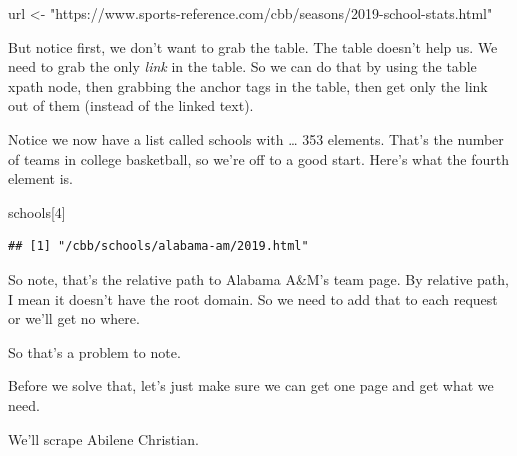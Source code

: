 \documentclass[]{book}
\newenvironment{Shaded}{\begin{snugshade}}{\end{snugshade}}
\newcommand{\KeywordTok}[1]{\textcolor[rgb]{0.13,0.29,0.53}{\textbf{#1}}}
\newcommand{\DataTypeTok}[1]{\textcolor[rgb]{0.13,0.29,0.53}{#1}}
\newcommand{\DecValTok}[1]{\textcolor[rgb]{0.00,0.00,0.81}{#1}}
\newcommand{\StringTok}[1]{\textcolor[rgb]{0.31,0.60,0.02}{#1}}
\newcommand{\OperatorTok}[1]{\textcolor[rgb]{0.81,0.36,0.00}{\textbf{#1}}}
\newcommand{\NormalTok}[1]{#1}
\begin{document}
\begin{Shaded}
\begin{Highlighting}[]
\NormalTok{url <-}\StringTok{ "https://www.sports-reference.com/cbb/seasons/2019-school-stats.html"}
\end{Highlighting}
\end{Shaded}

But notice first, we don't want to grab the table. The table doesn't
help us. We need to grab the only \emph{link} in the table. So we can do
that by using the table xpath node, then grabbing the anchor tags in the
table, then get only the link out of them (instead of the linked text).

\begin{Shaded}
\end{Shaded}

Notice we now have a list called schools with \ldots{} 353 elements.
That's the number of teams in college basketball, so we're off to a good
start. Here's what the fourth element is.

\begin{Shaded}
\begin{Highlighting}[]
\NormalTok{schools[}\DecValTok{4}\NormalTok{]}
\end{Highlighting}
\end{Shaded}

\begin{verbatim}
## [1] "/cbb/schools/alabama-am/2019.html"
\end{verbatim}

So note, that's the relative path to Alabama A\&M's team page. By
relative path, I mean it doesn't have the root domain. So we need to add
that to each request or we'll get no where.

So that's a problem to note.

Before we solve that, let's just make sure we can get one page and get
what we need.

We'll scrape Abilene Christian.
\end{document}
